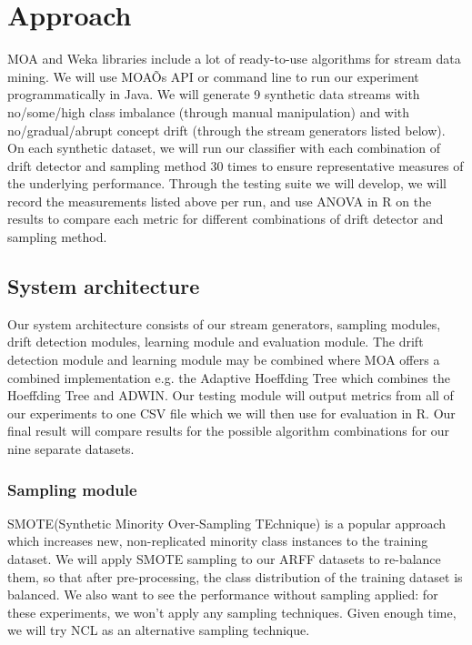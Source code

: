 \documentclass[11pt]{article}\usepackage[]{graphicx}\usepackage[]{color}
\begin{document}
\section{Approach}

MOA and  Weka libraries include a lot of ready-to-use algorithms for stream data mining. We will use MOAÕs API or command line to run our experiment programmatically in Java. We will generate 9 synthetic data streams with no/some/high class imbalance (through manual manipulation) and with no/gradual/abrupt concept drift (through the stream generators listed below). On each synthetic dataset, we will run our classifier with each combination of drift detector and sampling method 30 times to ensure representative measures of the underlying performance. Through the testing suite we will develop, we will record the measurements listed above per run, and use ANOVA in R on the results to compare each metric for different combinations of drift detector and sampling method.
	
\subsection{System architecture}				
Our system architecture consists of our stream generators, sampling modules, drift detection modules, learning module and evaluation module. The drift detection module and learning module may be combined where MOA offers a combined implementation e.g. the Adaptive Hoeffding Tree which combines the Hoeffding Tree and ADWIN. Our testing module will output metrics from all of our experiments to one CSV file which we will then use for evaluation in R. Our final result will compare results for the possible algorithm combinations for our nine separate datasets.

\subsubsection{Sampling module}
SMOTE(Synthetic Minority Over-Sampling TEchnique) is a popular approach which increases new, non-replicated minority class instances to the training dataset. We will apply SMOTE sampling to our ARFF datasets to re-balance them, so that after pre-processing, the class distribution of the training dataset is balanced. We also want to see the performance without sampling applied: for these experiments, we won't apply any sampling techniques. Given enough time, we will try NCL as an alternative sampling technique.		
		
\end{document}
